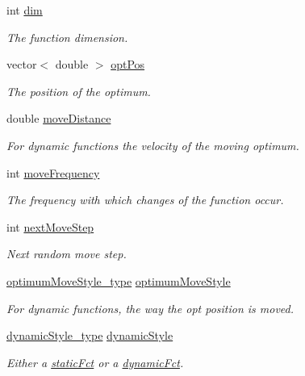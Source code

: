 \begin{CompactItemize}
int \hyperlink{classFunction_4b8560408fbefc8a791b70f35959d3a1}{dim}
\begin{CompactList}\small\item\em The function dimension. \item\end{CompactList}\item 
vector$<$ double $>$ \hyperlink{classFunction_4c45efc6af5f358ac10a6d4b016ebadc}{optPos}
\begin{CompactList}\small\item\em The position of the optimum. \item\end{CompactList}\item 
double \hyperlink{classFunction_79f1670ff72b16c5b4af46d700dbc66c}{moveDistance}
\begin{CompactList}\small\item\em For dynamic functions the velocity of the moving optimum. \item\end{CompactList}\item 
int \hyperlink{classFunction_323cbb2de44582df3b9981e6c3416980}{moveFrequency}
\begin{CompactList}\small\item\em The frequency with which changes of the function occur. \item\end{CompactList}\item 
int \hyperlink{classFunction_990b828c459b554096554d0458e076a5}{nextMoveStep}
\begin{CompactList}\small\item\em Next random move step. \item\end{CompactList}\item 
\hyperlink{optfunctions_8h_ba5a89b2e159110d7dd33bced19b11ce}{optimumMoveStyle\_\-type} \hyperlink{classFunction_d3e8dc5ddc0a0c1227ed3e4bd75c3ab2}{optimumMoveStyle}
\begin{CompactList}\small\item\em For dynamic functions, the way the opt position is moved. \item\end{CompactList}\item 
\hyperlink{optfunctions_8h_ae9aa3a5dd199a43e77abc2cccf4477e}{dynamicStyle\_\-type} \hyperlink{classFunction_74e755186ee4ac7685a38f7bfd6c9618}{dynamicStyle}
\begin{CompactList}\small\item\em Either a \hyperlink{optfunctions_8h_ae9aa3a5dd199a43e77abc2cccf4477e0b2fe9dd5d310c8ff1b24a9d223d1b78}{staticFct} or a \hyperlink{optfunctions_8h_ae9aa3a5dd199a43e77abc2cccf4477ea12bc396312caea8de48af78a769175a}{dynamicFct}. \item\end{CompactList}\item 

\end{CompactItemize}
